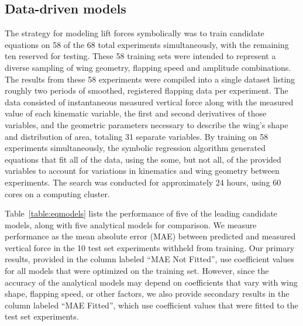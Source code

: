 \documentclass{article}
\begin{document}
\subsection*{Data-driven models}
The strategy for modeling lift forces symbolically was to train candidate
equations on 58 of the 68 total experiments simultaneously, with the remaining
ten reserved for testing.  These 58 training sets were intended to represent a
diverse sampling of wing geometry, flapping speed and amplitude combinations.
The results from these 58 experiments were compiled into a single dataset
listing roughly two periods of smoothed, registered flapping data per
experiment.  The data consisted of instantaneous measured vertical force along
with the measured value of each kinematic variable, the first and second
derivatives of those variables, and the geometric parameters necessary to
describe the wing's shape and distribution of area, totaling 31 separate
variables. By training on 58 experiments simultaneously, the symbolic regression
algorithm generated equations that fit all of the data, using the some, but not
all, of the provided variables to account for variations in kinematics and wing
geometry between experiments. The search was conducted for approximately 24
hours, using 60 cores on a computing cluster.

Table~\ref{table:eqmodels} lists the performance of five of the leading
candidate models, along with five analytical models for comparison. We measure
performance as the mean absolute error (MAE) between predicted and measured
vertical force in the 10 test set experiments withheld from training. Our
primary results, provided in the column labeled ``MAE Not Fitted'', use
coefficient values for all models that were optimized on the training set.
However, since the accuracy of the analytical models may depend on coefficients
that vary with wing shape, flapping speed, or other factors, we also provide
secondary results in the column labeled ``MAE Fitted'', which use coefficient
values that were fitted to the test set experiments.
\end{document}
